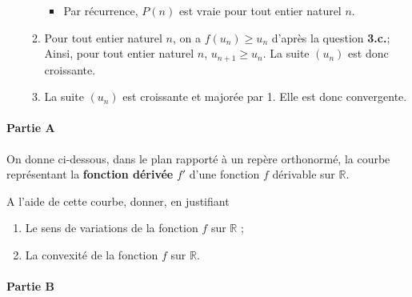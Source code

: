 \documentclass[11pt,fleqn, openany]{book} %
\begin{document}
\begin{solution}
\begin{enumerate}
\begin{enumerate}
\begin{itemize}
\item Par récurrence, $P(n)$ est vraie pour tout entier naturel $n$.
\end{itemize}
\item Pour tout entier naturel $n$, on a $f(u_n)\geqslant u_n$ d'après la question \textbf{3.c.}; Ainsi, pour tout entier naturel $n$, $u_{n+1}\geqslant u_n$. La suite $(u_n)$ est donc croissante.
\item La suite $(u_n)$ est croissante et majorée par 1. Elle est donc convergente.
\end{enumerate}
\end{enumerate}
\end{solution}





\begin{exercise}[subtitle={(Métropole 2021)}]

\paragraph{Partie A}

On donne ci-dessous, dans le plan rapporté à un repère orthonormé, la courbe représentant la\textbf{ fonction dérivée} $f'$ d'une fonction $f$ dérivable sur $\mathbb{R}$.

\begin{center}
\end{center}

A l'aide de cette courbe, donner, en justifiant
\begin{enumerate}
\item Le sens de variations de la fonction $f$ sur $\mathbb{R}$ ;
\item La convexité de la fonction $f$ sur $\mathbb{R}$.
\end{enumerate}


\paragraph{Partie B}


\end{exercise}
\end{document}
